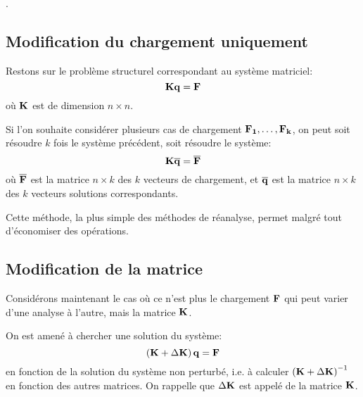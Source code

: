 \medskip
{}.


\medskip
\subsection{Modification du chargement uniquement}
Restons sur le problème structurel correspondant au système matriciel:
\begin{equation}
\mathbf{K} \mathbf{q} = \mathbf{F}
\end{equation}
où $\mathbf{K}$ est de dimension $n\times n$.%

\medskip
Si l'on souhaite considérer plusieurs cas de chargement $\mathbf{F_1},\ldots,\mathbf{F_k}$, on peut soit résoudre
$k$ fois le système précédent, soit résoudre le système:
\begin{equation}
\mathbf{K} \mathbf{\overline{q}} =\mathbf{\overline{F}}
\end{equation}
où $\mathbf{\overline{F}}$ est la matrice $n\times k$ des $k$ vecteurs de chargement, et $\mathbf{\overline{q}}$ est la
matrice $n\times k$ des $k$ vecteurs solutions correspondants.

\medskip
Cette méthode, la plus simple des méthodes de réanalyse, permet malgré tout
d'économiser des opérations.


\medskip
\subsection{Modification de la matrice}
Considérons maintenant le cas où ce n'est plus le chargement $\mathbf{F}$ qui peut varier d'une analyse
à l'autre, mais la matrice $\mathbf{K}$.

On est amené à chercher une solution du système:
\begin{equation}
\left(\mathbf{K}+\Delta\mathbf{ K}\right)\mathbf{q}=\mathbf{F}
\end{equation}
en fonction de la solution du système non perturbé, i.e. à calculer $\left(\mathbf{K}+\Delta\mathbf{K}\right)^{-1}$
en fonction des autres matrices. On rappelle que $\Delta\mathbf{ K}$ est appelé 
 de la matrice $\mathbf{K}$.

